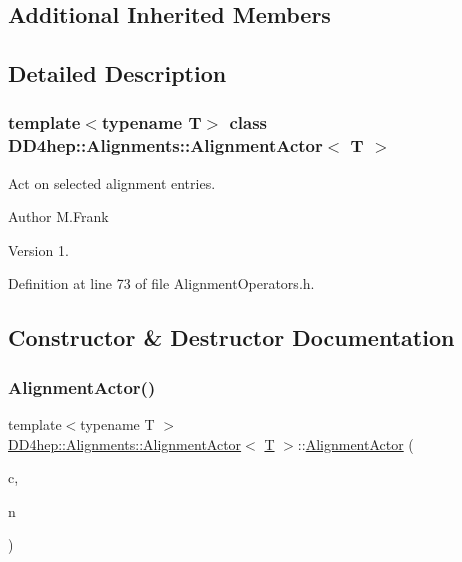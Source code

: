 \subsection*{Additional Inherited Members}


\subsection{Detailed Description}
\subsubsection*{template$<$typename T$>$\newline
class D\+D4hep\+::\+Alignments\+::\+Alignment\+Actor$<$ T $>$}

Act on selected alignment entries. 

\begin{DoxyAuthor}{Author}
M.\+Frank 
\end{DoxyAuthor}
\begin{DoxyVersion}{Version}
1. 
\end{DoxyVersion}


Definition at line 73 of file Alignment\+Operators.\+h.



\subsection{Constructor \& Destructor Documentation}
\hypertarget{class_d_d4hep_1_1_alignments_1_1_alignment_actor_a4442541ec4416c08e7a36c7b5eaacbfb}{}\label{class_d_d4hep_1_1_alignments_1_1_alignment_actor_a4442541ec4416c08e7a36c7b5eaacbfb} 
\subsubsection{\texorpdfstring{Alignment\+Actor()}{AlignmentActor()}}
{\footnotesize\ttfamily template$<$typename T $>$ \\
\hyperlink{class_d_d4hep_1_1_alignments_1_1_alignment_actor}{D\+D4hep\+::\+Alignments\+::\+Alignment\+Actor}$<$ \hyperlink{class_t}{T} $>$\+::\hyperlink{class_d_d4hep_1_1_alignments_1_1_alignment_actor}{Alignment\+Actor} (\begin{DoxyParamCaption}\item[{\hyperlink{class_d_d4hep_1_1_alignments_1_1_global_alignment_cache}{Global\+Alignment\+Cache} \&}]{c,  }\item[{\hyperlink{class_d_d4hep_1_1_alignments_1_1_alignment_operator_a2f25eae1d38abc30a09f7a840ab0662a}{Nodes} \&}]{n }\end{DoxyParamCaption})\hspace{0.3cm}{\ttfamily [inline]}}



